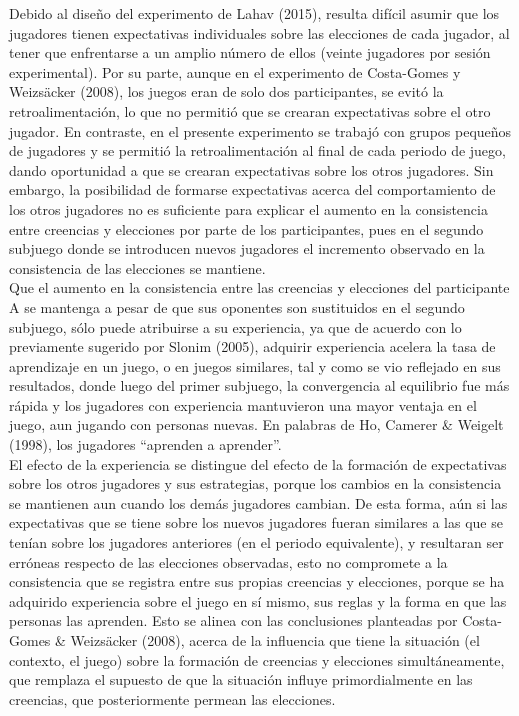 \begin{itemize}
Debido al diseño del experimento de Lahav (2015), resulta difícil asumir que los jugadores tienen expectativas individuales sobre las elecciones de cada jugador, al tener que enfrentarse a un amplio número de ellos (veinte jugadores por sesión experimental). Por su parte, aunque en el experimento de Costa-Gomes y Weizsäcker (2008), los juegos eran de solo dos participantes, se evitó la retroalimentación, lo que no permitió que se crearan expectativas sobre el otro jugador. En contraste, en el presente experimento se trabajó con grupos pequeños de jugadores y se permitió la retroalimentación al final de cada periodo de juego, dando oportunidad a que se crearan expectativas sobre los otros jugadores. Sin embargo, la  posibilidad de formarse expectativas acerca del comportamiento de los otros jugadores no es suficiente para explicar el aumento en la consistencia entre creencias y elecciones por parte de los participantes, pues en el segundo subjuego donde se introducen nuevos jugadores el incremento observado en la consistencia de las elecciones se mantiene.\\

Que el aumento en la consistencia entre las creencias y elecciones del participante A se mantenga a pesar de que sus oponentes son sustituidos en el segundo subjuego, sólo puede atribuirse a su experiencia, ya que de acuerdo con lo previamente sugerido por Slonim (2005), adquirir experiencia acelera la tasa de aprendizaje en un juego, o en juegos similares, tal y como se vio  reflejado en sus resultados, donde luego del primer subjuego, la convergencia al equilibrio fue más rápida y los jugadores con experiencia mantuvieron una mayor ventaja en el juego, aun jugando con personas nuevas. En palabras de Ho, Camerer & Weigelt (1998), los jugadores “aprenden a aprender”.\\

El efecto de la experiencia se distingue del efecto de la formación de expectativas sobre los otros jugadores y sus estrategias, porque los cambios en la consistencia se mantienen aun cuando los demás jugadores cambian. De esta forma, aún si las expectativas que se tiene sobre los nuevos jugadores fueran similares a las que se tenían sobre los jugadores anteriores (en el periodo equivalente), y resultaran ser erróneas respecto de las elecciones observadas, esto no compromete a la consistencia que se registra entre sus propias creencias y elecciones, porque se ha adquirido experiencia sobre el juego en sí mismo, sus reglas y la forma en que las personas las aprenden. Esto se alinea con las conclusiones planteadas por Costa-Gomes & Weizsäcker (2008), acerca de la influencia que tiene la situación (el contexto, el juego) sobre la formación de creencias y elecciones simultáneamente, que remplaza el supuesto de que la situación influye primordialmente en las creencias, que posteriormente permean las elecciones.\\


\end{itemize}
